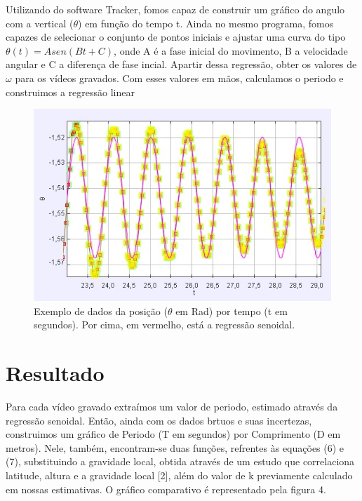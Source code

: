 \documentclass[hidelinks,a4paper,10pt]{article}
\begin{document}
\qquad Utilizando do software Tracker, fomos capaz de construir um gráfico do angulo com a vertical ($\theta$) em função do tempo t. 
Ainda no mesmo programa, fomos capazes de selecionar o conjunto de pontos iniciais e ajustar uma curva do tipo $\theta (t) = Asen (Bt + C)$, onde A é a fase inicial do movimento, B a velocidade angular
e C a diferença de fase incial. Apartir dessa regressão, obter os valores de $\omega$ 
para os vídeos gravados. Com esses valores em mãos, calculamos o periodo e construimos a regressão linear
\begin{figure}[h]
    \centering
    \includegraphics[width=0.5\linewidth]{grafico3.png}
    \caption{\small{Exemplo de dados da posição ($\theta$ em Rad) por tempo (t em segundos). Por cima, em vermelho, está a regressão senoidal.}}
    \label{fig:1.4}
\end{figure}

\section*{Resultado}
\qquad Para cada vídeo gravado extraímos um valor de periodo, estimado
através da regressão senoidal. Então, ainda com os dados brtuos e suas incertezas, construimos um gráfico de Periodo (T em segundos) por Comprimento (D em metros). 
Nele, também, encontram-se duas funções, refrentes às equações (6) e (7), substituindo a gravidade local, obtida através de um estudo que correlaciona latitude, altura e a gravidade local [2], além 
do valor de k previamente calculado em nossas estimativas. O gráfico comparativo é representado pela figura 4.
\end{document}
